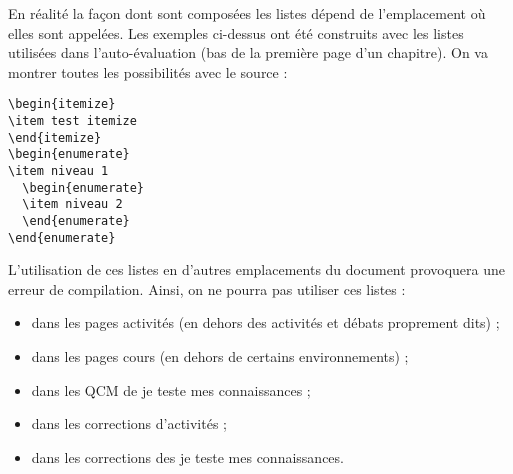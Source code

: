 \documentclass[nocrop]{sesamanuel}
\begin{document}
\label{liste-debut-listes}
En réalité la façon dont sont composées les listes dépend de
l'emplacement où elles sont appelées. Les exemples ci-dessus ont été
construits avec les listes utilisées dans l'auto-évaluation (bas de la
première page d'un chapitre). On va montrer toutes les possibilités
avec le source :
\begin{verbatim}
\begin{itemize}
\item test itemize
\end{itemize}
\begin{enumerate}
\item niveau 1
  \begin{enumerate}
  \item niveau 2
  \end{enumerate}
\end{enumerate}
\end{verbatim}


\label{liste-fin-listes}
L'utilisation de ces listes en d'autres emplacements du document
provoquera une erreur de compilation. Ainsi, on ne pourra pas utiliser
ces listes :
\begingroup
{}
\begin{itemize}
\item dans les pages activités (en dehors des activités et débats
  proprement dits) ;
\item dans les pages cours (en dehors de certains environnements) ;
\item dans les QCM de je teste mes connaissances ;
\item dans les corrections d'activités ;
\item dans les corrections des je teste mes connaissances.
\end{itemize}
\endgroup
\end{document}

